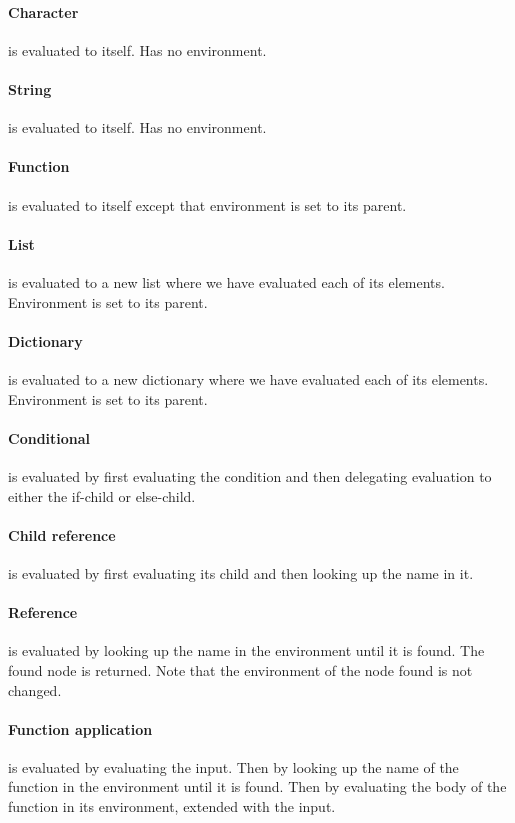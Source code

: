 \documentclass[a4paper,12pt]{article}
\begin{document}
\paragraph{Character} is evaluated to itself. Has no environment.
\paragraph{String} is evaluated to itself. Has no environment.
\paragraph{Function} is evaluated to itself except that environment is set to its parent.
\paragraph{List} is evaluated to a new list where we have evaluated each of its elements. Environment is set to its parent.
\paragraph{Dictionary} is evaluated to a new dictionary where we have evaluated each of its elements. Environment is set to its parent.
\paragraph{Conditional} is evaluated by first evaluating the condition and then delegating evaluation to either the if-child or else-child.
\paragraph{Child reference} is evaluated by first evaluating its child and then looking up the name in it.
\paragraph{Reference} is evaluated by looking up the name in the environment until it is found. The found node is returned. Note that the environment of the node found is not changed.
\paragraph{Function application} is evaluated by evaluating the input. Then by looking up the name of the function in the environment until it is found. Then by evaluating the body of the function in its environment, extended with the input.
\end{document}
